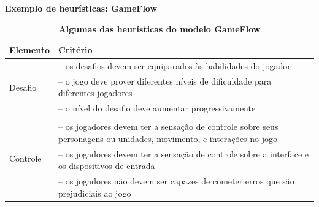 \expandafter\documentclass\expandafter[table, usenames, svgnames, dvipsnames, \classopts]{beamer}
\begin{document}
\begin{frame}{\textbf{Exemplo de heurísticas: GameFlow}}

	\begin{table}
		\scriptsize
		\setlength{\tabcolsep}{1pt}
		\renewcommand{\arraystretch}{1.5}
		\caption{\textbf{Algumas das heurísticas do modelo GameFlow} \cite{Sweetser2005}}

		\begin{tabular}{p{}p{}}

			\toprule
			\textbf{Elemento} & \textbf{Critério}\\
			\midrule
			\multirow{3}{*}{Desafio}  & -- os desafios devem ser equiparados às habilidades do jogador\\
									  & -- o jogo deve prover diferentes níveis de dificuldade para diferentes jogadores\\
									  & -- o nível do desafio deve aumentar progressivamente\\[1em]
			\midrule

			\multirow{4}{*}{Controle} & \\ & -- os jogadores devem ter a sensação de controle sobre seus personagens ou unidades, movimento, e interações no jogo\\
									  & -- os jogadores devem ter a sensação de controle sobre a interface e os dispositivos de entrada\\
									  & -- os jogadores não devem ser capazes de cometer erros que são prejudiciais ao jogo\\
			\bottomrule
		
		\end{tabular}

	\end{table}

\end{frame}
\end{document}
